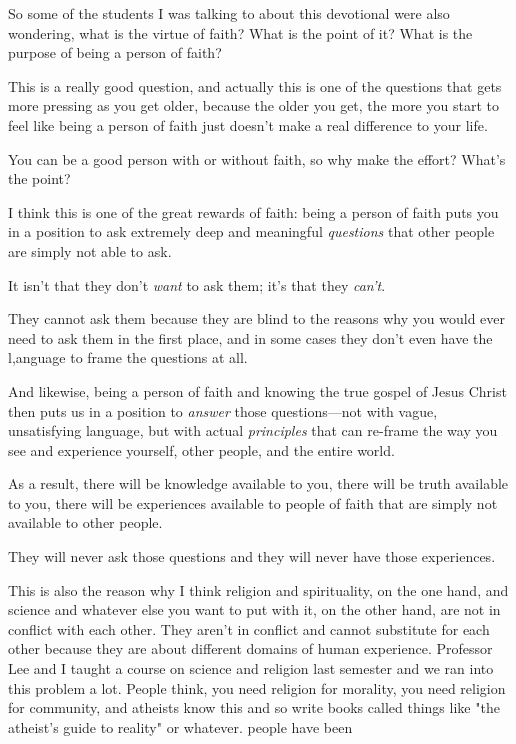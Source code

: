 \begin{compactitem}
			\item So some of the students I was talking to about this devotional were also wondering, what is the virtue of faith? What is the point of it? What is the purpose of being a person of faith?
				\begin{compactitem}
					\item This is a really good question, and actually this is one of the questions that gets more pressing as you get older, because the older you get, the more you start to feel like being a person of faith just doesn't make a real difference to your life.
					\item You can be a good person with or without faith, so why make the effort? What's the point?
					\item I think this is one of the great rewards of faith: being a person of faith puts you in a position to ask extremely deep and meaningful \textit{questions} that other people are simply not able to ask.
					\item It isn't that they don't \textit{want} to ask them; it's that they \textit{can't}.
					\item They cannot ask them because they are blind to the reasons why you would ever need to ask them in the first place, and in some cases they don't even have the l,anguage to frame the questions at all.
					\item And likewise, being a person of faith and knowing the true gospel of Jesus Christ then puts us in a position to \textit{answer} those questions---not with vague, unsatisfying language, but with actual \textit{principles} that can re-frame the way you see and experience yourself, other people, and the entire world.
					\item As a result, there will be knowledge available to you, there will be truth available to you, there will be experiences available to people of faith that are simply not available to other people.
					\item They will never ask those questions and they will never have those experiences.
				\end{compactitem}
				
			\item This is also the reason why I think religion and spirituality, on the one hand, and science and whatever else you want to put with it, on the other hand, are not in conflict with each other. They aren't in conflict and cannot substitute for each other because they are about different domains of human experience. 
				Professor Lee and I taught a course on science and religion last semester and we ran into this problem a lot.
				People think, you need religion for morality, you need religion for community, and 
				atheists know this and so write books called things like "the atheist's guide to reality" or whatever.
				people have been
				

\end{compactitem}
